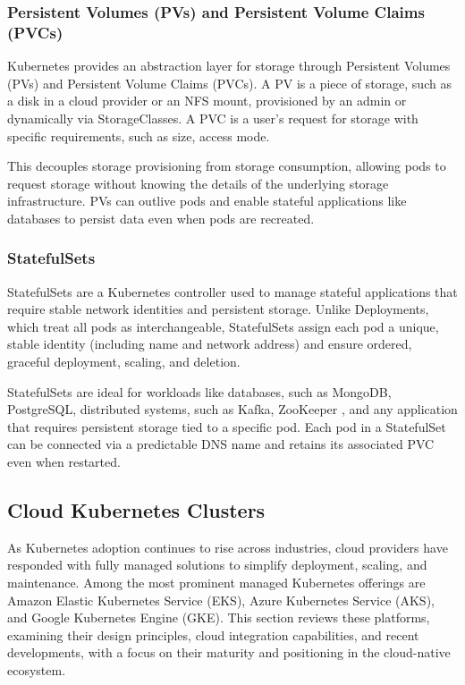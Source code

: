 \subsubsection{Persistent Volumes (PVs) and Persistent Volume Claims (PVCs)}
Kubernetes provides an abstraction layer for storage through Persistent Volumes (PVs) and Persistent Volume Claims (PVCs). A PV is a piece of storage, such as a disk in a cloud provider or an NFS mount, provisioned by an admin or dynamically via StorageClasses. A PVC is a user's request for storage with specific requirements, such as size, access mode.

This decouples storage provisioning from storage consumption, allowing pods to request storage without knowing the details of the underlying storage infrastructure. PVs can outlive pods and enable stateful applications like databases to persist data even when pods are recreated.

\subsubsection{StatefulSets}
StatefulSets are a Kubernetes controller used to manage stateful applications that require stable network identities and persistent storage. Unlike Deployments, which treat all pods as interchangeable, StatefulSets assign each pod a unique, stable identity (including name and network address) and ensure ordered, graceful deployment, scaling, and deletion.

StatefulSets are ideal for workloads like databases, such as MongoDB, PostgreSQL, distributed systems, such as Kafka, ZooKeeper \cite{zookeeper-docs}, and any application that requires persistent storage tied to a specific pod. Each pod in a StatefulSet can be connected via a predictable DNS name and retains its associated PVC even when restarted.

\subsection{Cloud Kubernetes Clusters}
As Kubernetes adoption continues to rise across industries, cloud providers have responded with fully managed solutions to simplify deployment, scaling, and maintenance. Among the most prominent managed Kubernetes offerings are Amazon Elastic Kubernetes Service (EKS), Azure Kubernetes Service (AKS), and Google Kubernetes Engine (GKE). This section reviews these platforms, examining their design principles, cloud integration capabilities, and recent developments, with a focus on their maturity and positioning in the cloud-native ecosystem.

